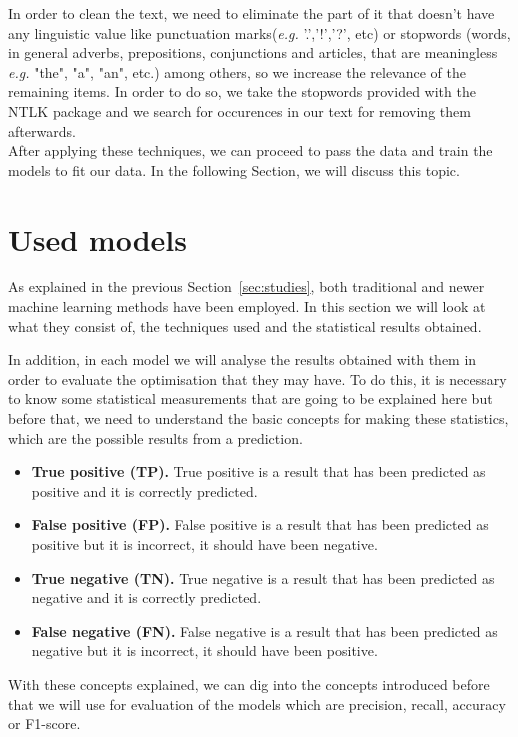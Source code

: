 In order to clean the text, we need to eliminate the part of it that doesn't have any linguistic value like punctuation marks(\textit{e.g.} '.','!','?', etc) or stopwords (words, in general adverbs, prepositions, conjunctions and articles, that are meaningless \textit{e.g.} "the", "a", "an", etc.) among others, so we increase the relevance of the remaining items. In order to do so, we take the stopwords provided with the NTLK package and we search for occurences in our text for removing them afterwards.\\


After applying these techniques, we can proceed to pass the data and train the models to fit our data. In the following Section, we will discuss this topic.

\section{Used models}
As explained in the previous Section~\ref{sec:studies}, both traditional and newer machine learning methods have been employed. In this section we will look at what they consist of, the techniques used and the statistical results obtained.

In addition, in each model we will analyse the results obtained with them in order to evaluate the optimisation that they may have. To do this, it is necessary to know some statistical measurements that are going to be explained here but before that, we need to understand the basic concepts for making these statistics, which are the possible results from a prediction.
\begin{itemize}
    \item\textbf{ True positive (TP).} True positive is a result that has been predicted as positive and it is correctly predicted.
    \item\textbf{ False positive (FP).} False positive is a result that has been predicted as positive but it is incorrect, it should have been negative. 
    \item \textbf{True negative (TN).} True negative is a result that has been predicted as negative and it is correctly predicted. 
    \item \textbf{False negative (FN).} False negative is a result that has been predicted as negative but it is incorrect, it should have been positive.
\end{itemize}

With these concepts explained, we can dig into the concepts introduced before that we will use for evaluation of the models which are precision, recall, accuracy or F1-score.

